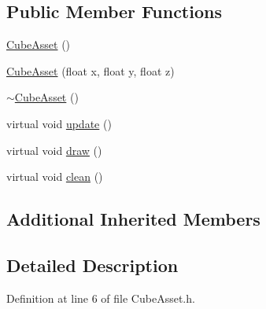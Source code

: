 \subsection*{Public Member Functions}
\begin{DoxyCompactItemize}
\item 
\hyperlink{classCubeAsset_a2f46c2bbb2453371b7ed97b50125aaf3}{Cube\-Asset} ()
\item 
\hyperlink{classCubeAsset_ad75b73237824794b0822c3404c554523}{Cube\-Asset} (float x, float y, float z)
\item 
\hyperlink{classCubeAsset_ab3ab9a5da82cbf8537a28652410093b1}{$\sim$\-Cube\-Asset} ()
\item 
virtual void \hyperlink{classCubeAsset_a45f15f556999ddb0789eaf01fb0df45d}{update} ()
\item 
virtual void \hyperlink{classCubeAsset_ae986d0b82941b268666f697877530ca5}{draw} ()
\item 
virtual void \hyperlink{classCubeAsset_af158511433013403bc4fe0c13e8577f3}{clean} ()
\end{DoxyCompactItemize}
\subsection*{Additional Inherited Members}


\subsection{Detailed Description}


Definition at line 6 of file Cube\-Asset.\-h.



